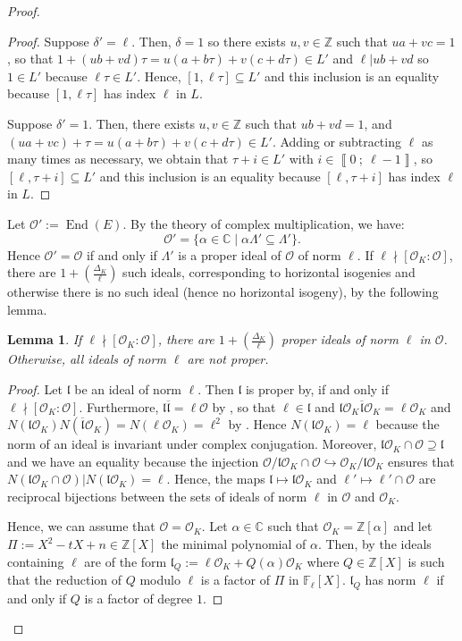 \documentclass[a4paper,10pt,notitlepage]{report}
\theoremstyle{definition}
\theoremstyle{plain}
\newtheorem{Lemma}[Definition]{Lemma}
\theoremstyle{definition}
\newcommand{\Z}{\mathbb{Z}}
\newcommand{\C}{\mathbb{C}}
\newcommand{\F}{\mathbb{F}}
\newcommand{\mO}{\mathcal{O}}
\renewcommand{\i}[2]{\left\llbracket #1~;~#2\right\rrbracket}
\renewcommand{\(}{\left(}
\renewcommand{\)}{\right)}
\newcommand{\mf}[1]{\mathfrak{#1}}
\DeclareMathOperator{\End}{End}
\begin{document}
\begin{proof}
\begin{proof}
Suppose $\delta'=\ell$.  Then, $\delta=1$ so there exists $u, v\in\Z$ such that $ua+vc=1$, so that $1+(ub+vd)\tau=u(a+b\tau)+v(c+d\tau)\in L'$ and $\ell|ub+vd$ so $1\in L'$ because $\ell\tau\in L'$. Hence, $[1,\ell\tau]\subseteq L'$ and this inclusion is an equality because $[1,\ell\tau]$ has index $\ell$ in $L$. 

Suppose $\delta'=1$.  Then, there exists $u, v\in\Z$ such that $ub+vd=1$, and $(ua+vc)+\tau=u(a+b\tau)+v(c+d\tau)\in L'$. Adding or subtracting $\ell$ as many times as necessary, we obtain that $\tau+i\in L'$ with $i\in\i{0}{\ell-1}$, so $[\ell,\tau+i]\subseteq L'$ and this inclusion is an equality because $[\ell,\tau+i]$ has index $\ell$ in $L$. 
\end{proof}

Let $\mO':=\End(E)$. By the theory of complex multiplication, we have:
\[\mO'=\{\alpha\in\C\mid \alpha \Lambda'\subseteq\Lambda'\}.\]
Hence $\mO'=\mO$ if and only if $\Lambda'$ is a proper ideal of $\mO$ of norm $\ell$.  If $\ell\nmid [\mO_K:\mO]$, there are $1+\(\frac{\Delta_K}{\ell}\)$ such ideals, corresponding to horizontal isogenies and otherwise there is no such ideal (hence no horizontal isogeny), by the following lemma. 

\begin{Lemma}\label{Lemma 1}
If $\ell\nmid [\mO_K:\mO]$, there are $1+\(\frac{\Delta_K}{\ell}\)$ proper ideals of norm $\ell$ in $\mO$. Otherwise,  all ideals of norm $\ell$ are not proper.
\end{Lemma}

\begin{proof}
Let $\mf{l}$ be an ideal of norm $\ell$.  Then $\mf{l}$ is proper by, \cite[Lemma 7.18.(ii)]{Cox} if and only if $\ell\nmid [\mO_K:\mO]$.  Furthermore, $\mf{l}\overline{\mf{l}}=\ell\mO$ by \cite[Lemma 7.14.(iii)]{Cox}, so that $\ell\in\mf{l}$ and $\mf{l}\mO_K\overline{\mf{l}}\mO_K=\ell\mO_K$ and $N(\mf{l}\mO_K)N(\overline{\mf{l}}\mO_K)=N(\ell\mO_K)=\ell^2$ by \cite[Lemma 7.14.(ii)]{Cox}. Hence $N(\mf{l}\mO_K)=\ell$ because the norm of an ideal is invariant under complex conjugation.  Moreover, $\mf{l}\mO_K\cap\mO\supseteq \mf{l}$ and we have an equality because the injection $\mO/\mf{l}\mO_K\cap\mO\hookrightarrow \mO_K/\mf{l}\mO_K$ ensures that $N(\mf{l}\mO_K\cap \mO)|N(\mf{l}\mO_K)=\ell$. Hence, the maps $\mf{l}\longmapsto\mf{l}\mO_K$ and $\mf{\ell'}\longmapsto\mf{\ell'}\cap\mO$ are reciprocal bijections between the sets of ideals of norm $\ell$ in $\mO$ and $\mO_K$.

Hence, we can assume that $\mO=\mO_K$. Let $\alpha\in\C$ such that $\mO_K=\Z[\alpha]$ and let $\Pi:=X^2-tX+n\in\Z[X]$ the minimal polynomial of $\alpha$. Then, by \cite[Proposition I.25]{Lang_ANT} the ideals containing $\ell$ are of the form $\mf{l}_Q:=\ell\mO_K+Q(\alpha)\mO_K$ where $Q\in\Z[X]$ is such that the reduction of $Q$ modulo $\ell$ is a factor of $\Pi$ in $\F_\ell[X]$.  $\mf{l}_Q$ has norm $\ell$ if and only if $Q$ is a factor of degree $1$. 


\end{proof}
\end{proof}
\end{document}
